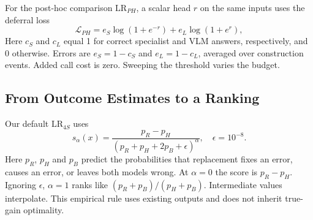 For the post-hoc comparison $\mathrm{LR}_{PH}$, a scalar head $r$ on the same inputs uses the deferral loss~\cite{posthocdefer}
\begin{equation}
\mathcal L_{PH}=e_S\log(1+e^{-r})+e_L\log(1+e^{r}),
\label{eq:posthoc}
\end{equation}
Here $c_S$ and $c_L$ equal 1 for correct specialist and VLM answers, respectively, and 0 otherwise. Errors are $e_S=1-c_S$ and $e_L=1-c_L$, averaged over construction events. Added call cost is zero. Sweeping the threshold varies the budget.

\subsection{From Outcome Estimates to a Ranking}
Our default $\mathrm{LR}_{4S}$ uses
\begin{equation}
s_\alpha(x)=\frac{p_R-p_H}{(p_R+p_H+2p_B+\epsilon)^\alpha},
\quad \epsilon=10^{-8}.
\label{eq:score}
\end{equation}
Here $p_R$, $p_H$ and $p_B$ predict the probabilities that replacement fixes an error, causes an error, or leaves both models wrong. At $\alpha=0$ the score is $p_R-p_H$. Ignoring $\epsilon$, $\alpha=1$ ranks like $(p_R+p_B)/(p_H+p_B)$. Intermediate values interpolate. This empirical rule uses existing outputs and does not inherit true-gain optimality.
